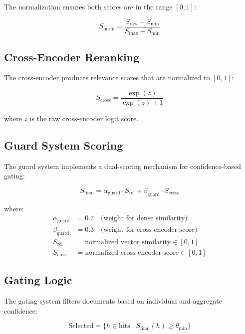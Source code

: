 \documentclass[11pt,a4paper]{article}
\begin{document}
The normalization ensures both scores are in the range $[0,1]$:

\begin{equation}
S_{\text{norm}} = \frac{S_{\text{raw}} - S_{\text{min}}}{S_{\text{max}} - S_{\text{min}}}
\end{equation}

\subsection{Cross-Encoder Reranking}

The cross-encoder produces relevance scores that are normalized to $[0,1]$:

\begin{equation}
S_{\text{cross}} = \frac{\exp(z)}{\exp(z) + 1}
\end{equation}

where $z$ is the raw cross-encoder logit score.

\subsection{Guard System Scoring}

The guard system implements a dual-scoring mechanism for confidence-based gating:

\begin{equation}
S_{\text{final}} = \alpha_{\text{guard}} \cdot S_{\text{rel}} + \beta_{\text{guard}} \cdot S_{\text{cross}}
\end{equation}

where:
\begin{align}
\alpha_{\text{guard}} &= 0.7 \quad \text{(weight for dense similarity)}\\
\beta_{\text{guard}} &= 0.3 \quad \text{(weight for cross-encoder score)}\\
S_{\text{rel}} &= \text{normalized vector similarity} \in [0,1]\\
S_{\text{cross}} &= \text{normalized cross-encoder score} \in [0,1]
\end{align}

\subsection{Gating Logic}

The gating system filters documents based on individual and aggregate confidence:

\begin{equation}
\text{Selected} = \{h \in \text{hits} \mid S_{\text{final}}(h) \geq \theta_{\text{min}}\}
\end{equation}
\end{document}
